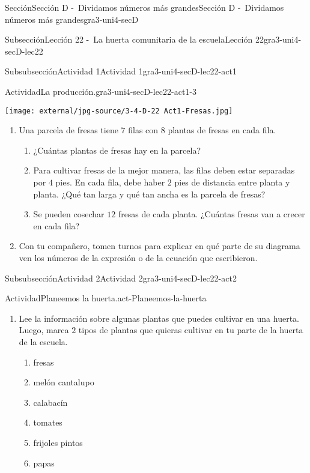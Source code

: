 \documentclass[twoside,10pt,]{article}
\begin{document}
\begin{sectionptx}{Sección}{Sección D -~Dividamos números más grandes}{}{Sección D -~Dividamos números más grandes}{}{}{gra3-uni4-secD}
\begin{subsectionptx}{Subsección}{Lección 22 -~La huerta comunitaria de la escuela}{}{Lección 22}{}{}{gra3-uni4-secD-lec22}
\begin{subsubsectionptx}{Subsubsección}{Actividad 1}{}{Actividad 1}{}{}{gra3-uni4-secD-lec22-act1}
\begin{activity}{Actividad}{La producción.}{gra3-uni4-secD-lec22-act1-3}
\begin{sidebyside}{2}{0}{0}{0}
\begin{sbspanel}{0.5}
\end{sbspanel}%
\begin{sbspanel}{0.5}%
\texttt{[image: external/jpg-source/3-4-D-22 Act1-Fresas.jpg]}
\end{sbspanel}%
\end{sidebyside}%
%
\begin{enumerate}
\item{}Una parcela de fresas tiene \(7\) filas con \(8\) plantas de fresas en cada fila.%
%
\begin{enumerate}
\item{}¿Cuántas plantas de fresas hay en la parcela?%
\item{}Para cultivar fresas de la mejor manera, las filas deben estar separadas por \(4\) pies. En cada fila, debe haber \(2\) pies de distancia entre planta y planta. ¿Qué tan larga y qué tan ancha es la parcela de fresas?%
\item{}Se pueden cosechar \(12\) fresas de cada planta. ¿Cuántas fresas van a crecer en cada fila?%
\end{enumerate}
\item{}Con tu compañero, tomen turnos para explicar en qué parte de su diagrama ven los números de la expresión o de la ecuación que escribieron.%
\end{enumerate}
\end{activity}%
\end{subsubsectionptx}
%
%
\typeout{************************************************}
\typeout{************************************************}
%
\begin{subsubsectionptx}{Subsubsección}{Actividad 2}{}{Actividad 2}{}{}{gra3-uni4-secD-lec22-act2}
\begin{activity}{Actividad}{Planeemos la huerta.}{act-Planeemos-la-huerta}%
%
\begin{enumerate}
\item{}Lee la información sobre algunas plantas que puedes cultivar en una huerta. Luego, marca \(2\) tipos de plantas que quieras cultivar en tu parte de la huerta de la escuela.%
%
\begin{enumerate}
\item{}fresas%
\item{}melón cantalupo%
\item{}calabacín%
\item{}tomates%
\item{}frijoles pintos%
\item{}papas%
\end{enumerate}

\end{enumerate}
\end{activity}
\end{subsubsectionptx}
\end{subsectionptx}
\end{sectionptx}
\end{document}
